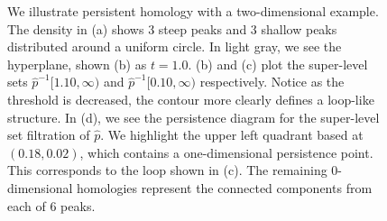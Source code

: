 \documentclass[12pt]{article}
\newcommand{\brittany}[1]{{\color{cyan} Brittany says: #1}}
\newcommand{\figref}[1]{Figure~\ref{#1}}
\def\R{{\mathbb R}}
\begin{document}
\begin{figure}
  \caption{ We illustrate persistent homology with a two-dimensional example. The density in (a) shows 3 steep peaks and 3 shallow peaks  distributed around a uniform circle. In light gray, we see the hyperplane, shown (b) as $t=1.0$. (b) and (c) plot the super-level sets $\widehat{p}^{-1}[1.10,\infty)$ and $\widehat{p}^{-1}[0.10,\infty)$ respectively. Notice as the threshold is decreased, the contour more clearly defines a loop-like structure. In (d), we see the  persistence diagram for the super-level set filtration of $\widehat{p}$. We highlight the upper left quadrant based at $(0.18, 0.02)$, which contains a one-dimensional persistence point. This corresponds to the loop shown in (c). The remaining 0-dimensional homologies represent the connected components from each of 6 peaks.} %
    \label{fig:homologyexample}
\end{figure}

%
\end{document}
